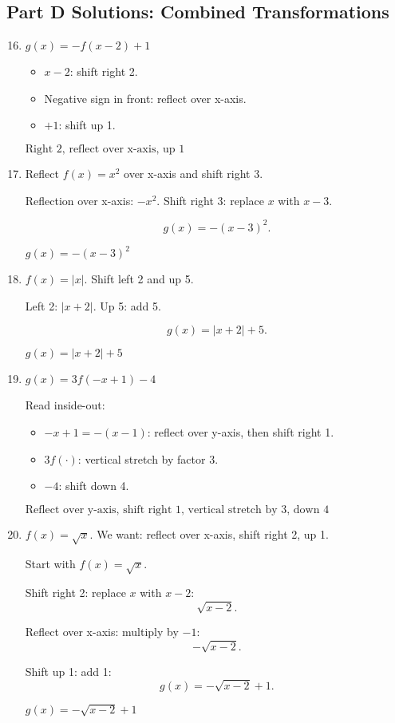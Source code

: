 \documentclass[12pt]{article}
\begin{document}
\subsection*{Part D Solutions: Combined Transformations}
\begin{enumerate}
  \setcounter{enumi}{15}
  \item \(g(x) = -f(x - 2) + 1\)

  \begin{itemize}
    \item \(x - 2\): shift right 2.
    \item Negative sign in front: reflect over x-axis.
    \item \(+1\): shift up 1.
  \end{itemize}

  \(\boxed{\text{Right 2, reflect over x-axis, up 1}}\)

  \item Reflect \(f(x) = x^2\) over x-axis and shift right 3.

  Reflection over x-axis: \(-x^2.\)  
  Shift right 3: replace \(x\) with \(x - 3\).

  \[
  g(x) = -(x - 3)^2.
  \]

  \(\boxed{g(x) = -(x - 3)^2}\)

  \item \(f(x) = |x|\). Shift left 2 and up 5.

  Left 2: \(|x + 2|\).  
  Up 5: add 5.

  \[
  g(x) = |x + 2| + 5.
  \]

  \(\boxed{g(x) = |x + 2| + 5}\)

  \item \(g(x) = 3f(-x + 1) - 4\)

  Read inside-out:
  \begin{itemize}
    \item \(-x + 1 = -(x - 1)\): reflect over y-axis, then shift right 1.
    \item \(3f(\cdot)\): vertical stretch by factor 3.
    \item \(-4\): shift down 4.
  \end{itemize}

  \(\boxed{\text{Reflect over y-axis, shift right 1, vertical stretch by 3, down 4}}\)

  \item \(f(x) = \sqrt{x}\). We want: reflect over x-axis, shift right 2, up 1.

  Start with \(f(x) = \sqrt{x}\).

  Shift right 2: replace \(x\) with \(x - 2\):
  \[
  \sqrt{x - 2}.
  \]

  Reflect over x-axis: multiply by \(-1\):
  \[
  -\sqrt{x - 2}.
  \]

  Shift up 1: add 1:
  \[
  g(x) = -\sqrt{x - 2} + 1.
  \]

  \(\boxed{g(x) = -\sqrt{x - 2} + 1}\)
\end{enumerate}
\end{document}
